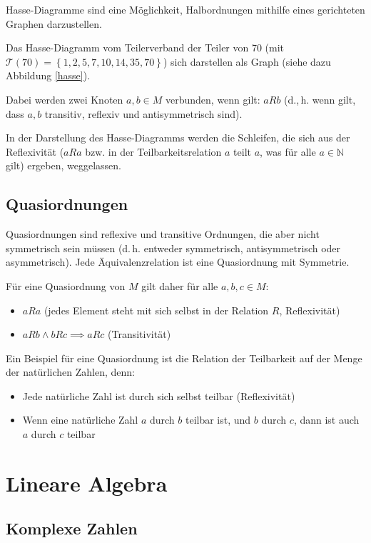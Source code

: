 \documentclass{scrartcl}
\begin{document}
Hasse-Diagramme sind eine Möglichkeit, Halbordnungen mithilfe eines
gerichteten Graphen darzustellen. 

Das Hasse-Diagramm vom Teilerverband der Teiler von 70 (mit 
$\mathcal{T}(70) = \left\{1, 2, 5, 7, 10, 14, 35, 70\right\}$) sich darstellen als
Graph (siehe dazu Abbildung \ref{hasse}).

Dabei werden zwei Knoten $a, b \in M$ verbunden, wenn gilt: $aRb$ (d.,\,h. wenn
gilt, dass $a, b$ transitiv, reflexiv und antisymmetrisch sind). 

In der Darstellung
des Hasse-Diagramms werden die Schleifen, die sich aus der Reflexivität ($aRa$ bzw.
in der Teilbarkeitsrelation $a$ teilt $a$, was für alle $a \in \mathbb{N}$ gilt) 
ergeben, weggelassen.

\subsection{Quasiordnungen}

Quasiordnungen sind reflexive und transitive Ordnungen, die aber nicht symmetrisch 
sein müssen (d.\,h. entweder symmetrisch, antisymmetrisch oder asymmetrisch). Jede
Äquivalenzrelation ist eine Quasiordnung mit Symmetrie.

Für eine Quasiordnung von $M$ gilt daher für alle $a, b, c \in M$:

\begin{itemize}
	\item $aRa$ (jedes Element steht mit sich selbst in der Relation 
		$R$, Reflexivität)
	\item $aRb \wedge bRc \implies aRc$ (Transitivität)
\end{itemize}

Ein Beispiel für eine Quasiordnung ist die Relation der Teilbarkeit auf
der Menge der natürlichen Zahlen, denn:

\begin{itemize}
	\item Jede natürliche Zahl ist durch sich selbst teilbar (Reflexivität)
	\item Wenn eine natürliche Zahl $a$ durch $b$ teilbar ist, und $b$ durch
		$c$, dann ist auch $a$ durch $c$ teilbar
\end{itemize}


\section{Lineare Algebra}

\subsection{Komplexe Zahlen}
\end{document}
